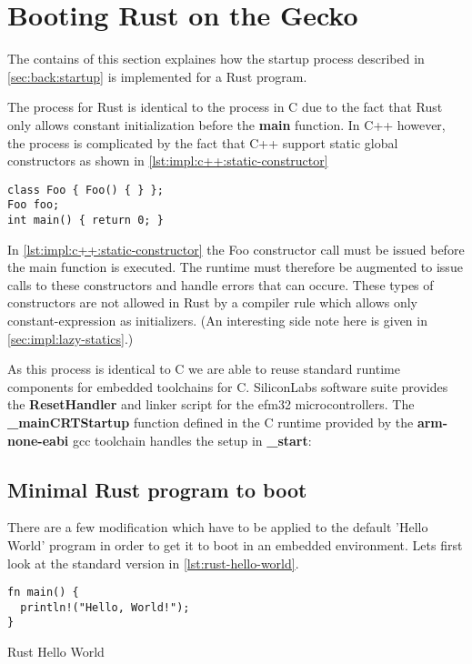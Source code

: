 \section{Booting Rust on the Gecko}

The contains of this section explaines how the startup process described in \autoref{sec:back:startup} is implemented for a Rust program.

The process for Rust is identical to the process in C due to the fact that Rust only allows constant initialization before the \textbf{main} function.
In C++ however, the process is complicated by the fact that C++ support static global constructors as shown in \autoref{lst:impl:c++:static-constructor}

\begin{listing}[H]
  \begin{verbatim}
class Foo { Foo() { } };
Foo foo;
int main() { return 0; }
  \end{verbatim}
  \caption{}
  \label{lst:impl:c++:static-constructor}
\end{listing}

In \autoref{lst:impl:c++:static-constructor} the Foo constructor call must be issued before the main function is executed.
The runtime must therefore be augmented to issue calls to these constructors and handle errors that can occure.
These types of constructors are not allowed in Rust by a compiler rule which allows only constant-expression as initializers.
(An interesting side note here is given in \autoref{sec:impl:lazy-statics}.)

As this process is identical to C we are able to reuse standard runtime components for embedded toolchains for C.
SiliconLabs software suite provides the \textbf{ResetHandler} and linker script for the efm32 microcontrollers.
The \textbf{\_mainCRTStartup} function defined in the C runtime provided by the \textbf{arm-none-eabi} gcc toolchain handles the setup in \textbf{\_start}:

\subsection{Minimal Rust program to boot}

There are a few modification which have to be applied to the default 'Hello World' program in order to get it to boot in an embedded environment.
Lets first look at the standard version in \autoref{lst:rust-hello-world}.

\begin{listing}[H]
\begin{verbatim}
fn main() {
  println!("Hello, World!");
}
\end{verbatim}
\label{lst:rust-hello-world}
\caption{Rust Hello World}
\end{listing}

